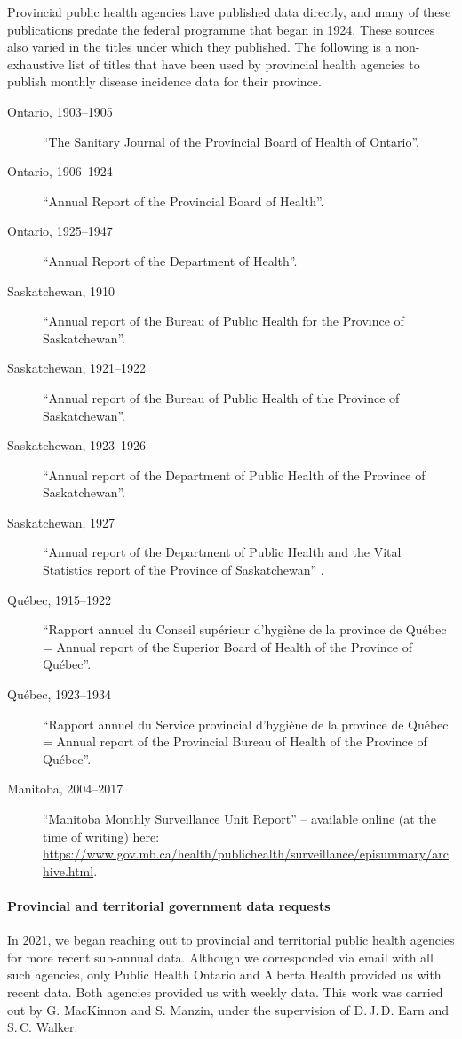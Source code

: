 \documentclass[12pt]{article}
\begin{document}
Provincial public health agencies have published data directly, and many of these publications predate the federal programme that began in 1924. These sources also varied in the titles under which they published. The following is a non-exhaustive list of titles that have been used by provincial health agencies to publish monthly disease incidence data for their province.
\begin{description}
  \item[Ontario, 1903--1905] ``The Sanitary Journal of the Provincial Board of Health of Ontario''.
  \item[Ontario, 1906--1924] ``Annual Report of the Provincial Board of Health''.
  \item[Ontario, 1925--1947] ``Annual Report of the Department of Health''.
  \item[Saskatchewan, 1910] ``Annual report of the Bureau of Public Health for the Province of Saskatchewan''.
  \item[Saskatchewan, 1921--1922] ``Annual report of the Bureau of Public Health of the Province of Saskatchewan''.
  \item[Saskatchewan, 1923--1926] ``Annual report of the Department of Public Health of the Province of Saskatchewan''.
  \item[Saskatchewan, 1927] ``Annual report of the Department of Public Health and the Vital Statistics report of the Province of Saskatchewan'' .
  \item[Québec, 1915--1922] ``Rapport annuel du Conseil supérieur d'hygiène de la province de Québec = Annual report of the Superior Board of Health of the Province of Québec''.
  \item[Québec, 1923--1934] ``Rapport annuel du Service provincial d'hygiène de la province de Québec = Annual report of the Provincial Bureau of Health of the Province of Québec''.
  \item[Manitoba, 2004--2017] ``Manitoba Monthly Surveillance Unit Report'' -- available online (at the time of writing) here: \url{https://www.gov.mb.ca/health/publichealth/surveillance/episummary/archive.html}. 
\end{description}

\paragraph*{Provincial and territorial government data requests}

In 2021, we began reaching out to provincial and territorial public health agencies for more recent sub-annual data. Although we corresponded via email with all such agencies, only Public Health Ontario and Alberta Health provided us with recent data. Both agencies provided us with weekly data. This work was carried out by G. MacKinnon and S. Manzin, under the supervision of D.\,J.\,D. Earn and S.\,C. Walker.
\end{document}
